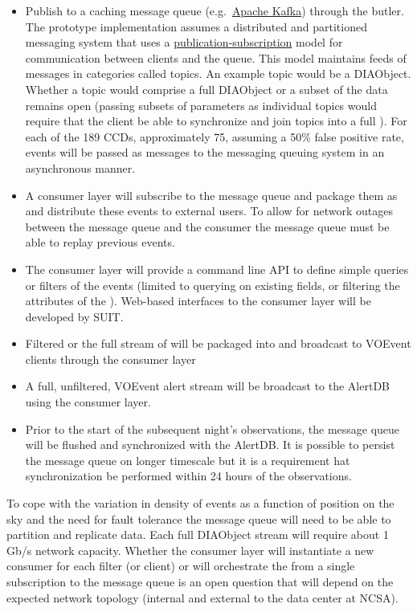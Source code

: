 \begin{itemize}
\item Publish \DIAObjects to a caching message queue (e.g.\ \hyperref[http://kafka.apache.org]{Apache Kafka}) through the butler. The prototype implementation assumes a distributed and partitioned messaging system that uses a \hyperref[https://en.wikipedia.org/wiki/Publish_subscribe_pattern]{publication-subscription} model for communication between clients and the queue. This model maintains feeds of messages in categories called topics. An example topic would be a DIAObject. Whether a topic would comprise a full DIAObject or a subset of the data remains open (passing subsets of parameters as individual topics would require that the client be able to synchronize and join topics into a full \DIAObject). For each of the 189 CCDs, approximately 75, assuming a 50\% false positive rate, events will be passed as messages to the messaging queuing system in an asynchronous manner.
\item A consumer layer will subscribe to the  message queue and package them as \VOEvents and distribute these events to external users. To allow for network outages between the message queue and the consumer the message queue must be able to replay previous events. 
\item  The consumer layer will provide a command line API to define simple queries or filters of the events (limited to querying on existing \DIAObject fields, or filtering the attributes of the \DIAObject). Web-based interfaces to the consumer layer will be developed by SUIT. 
\item Filtered or the full stream of \DIAObjects will be packaged into \VOEvents and broadcast to VOEvent clients through the consumer layer
\item A full, unfiltered, VOEvent alert stream will be broadcast to the AlertDB using the consumer layer. 
\item Prior to the start of the subsequent night's observations, the message queue will be flushed and synchronized with the AlertDB. It is possible to persist the message queue on longer timescale but it is a requirement hat synchronization be performed within 24 hours of the observations.
\end{itemize}


To cope with the variation in density of events as a function of position on the sky and the need for fault tolerance the message queue will need to be able to partition and replicate data. Each full DIAObject stream will require about 1 Gb/s network capacity. Whether the consumer layer will instantiate a new consumer for each filter (or client) or will orchestrate the \VOEvents from a single subscription to the message queue is an open question that will depend on the expected network topology (internal and external to the data center at NCSA).

